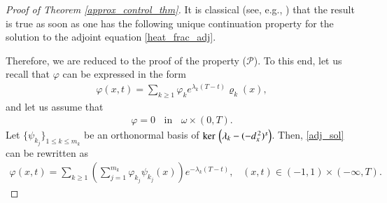 \begin{proof}[Proof of Theorem \ref{approx_control_thm}]
It is classical (see, e.g., \cite[Theorem 5.2]{micu2004introduction}) that the result is true as soon as one has the following unique continuation property for the solution to the adjoint equation \eqref{heat_frac_adj}.
	
Therefore, we are reduced to the proof of the property ($\mathcal P$). To this end, let us recall that $\varphi$ can be expressed in the form 
\begin{align}\label{adj_sol}
	\varphi(x,t) = \sum_{k\geq 1} \varphi_ke^{\lambda_k(T-t)}\varrho_k(x),
\end{align}
and let us assume that 
\begin{align}\label{uc}
	\varphi=0 \;\;\textrm{ in }\;\; \omega\times(0,T). 
\end{align}
Let $\{\psi_{k_j}\}_{1\leq k\leq m_k}$ be an orthonormal basis of $\ker\,\left(\lambda_k-(-d_x^{\,2})^{s}\right)$. Then, \eqref{adj_sol} can be rewritten as
\begin{align*}
	\varphi(x,t) = \sum_{k\geq 1} \left(\sum_{j=1}^{m_k} \varphi_{k_j}\psi_{k_j}(x)\right)e^{-\lambda_k(T-t)}, \;\;\; (x,t)\in (-1,1)\times(-\infty, T). 
\end{align*}


\end{proof}
